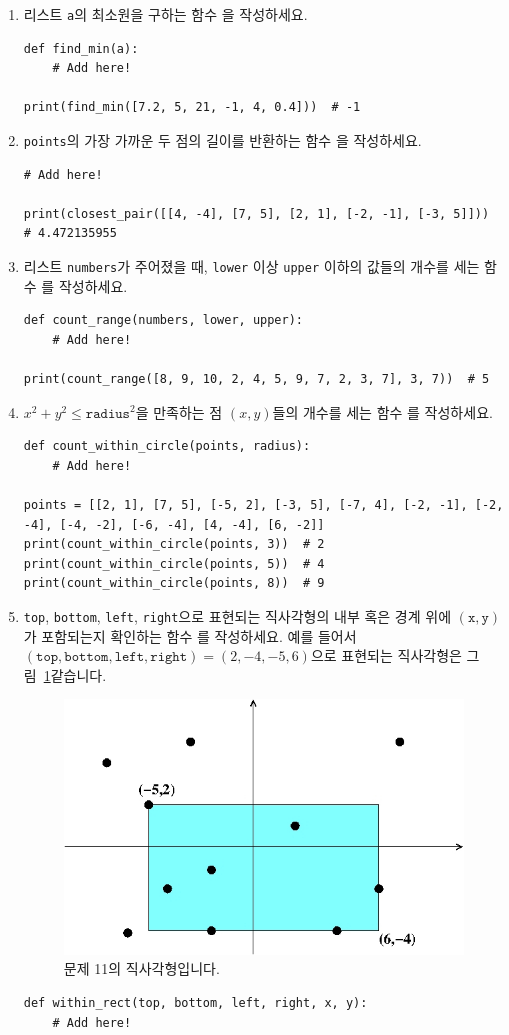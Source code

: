 \documentclass[../main.tex]{subfiles}
\begin{document}
\begin{enumerate}
\item 리스트 \verb/a/의 최소원을 구하는 함수 을 작성하세요.
\begin{verbatim}
def find_min(a):
    # Add here!

print(find_min([7.2, 5, 21, -1, 4, 0.4]))  # -1
\end{verbatim}

\item \verb/points/의 가장 가까운 두 점의 길이를 반환하는 함수 을 작성하세요.
\begin{verbatim}
# Add here!

print(closest_pair([[4, -4], [7, 5], [2, 1], [-2, -1], [-3, 5]]))  # 4.472135955
\end{verbatim}

\item 리스트 \verb/numbers/가 주어졌을 때, \verb/lower/ 이상 \verb/upper/ 이하의 값들의 개수를 세는 함수 를 작성하세요.
\begin{verbatim}
def count_range(numbers, lower, upper):
    # Add here!

print(count_range([8, 9, 10, 2, 4, 5, 9, 7, 2, 3, 7], 3, 7))  # 5
\end{verbatim}

\item $x^2 + y^2 \le \texttt{radius}^2$을 만족하는 점 $(x, y)$들의 개수를 세는 함수 를 작성하세요.
\begin{verbatim}
def count_within_circle(points, radius):
    # Add here!

points = [[2, 1], [7, 5], [-5, 2], [-3, 5], [-7, 4], [-2, -1], [-2, -4], [-4, -2], [-6, -4], [4, -4], [6, -2]]
print(count_within_circle(points, 3))  # 2
print(count_within_circle(points, 5))  # 4
print(count_within_circle(points, 8))  # 9
\end{verbatim}

\item \verb/top/, \verb/bottom/, \verb/left/, \verb/right/으로 표현되는 직사각형의 내부 혹은 경계 위에 $(\texttt{x}, \texttt{y})$가 포함되는지 확인하는 함수 를 작성하세요.
  예를 들어서 $(\texttt{top}, \texttt{bottom}, \texttt{left}, \texttt{right}) = (2, -4, -5, 6)$으로 표현되는 직사각형은 그림~\ref{fig:lecture4q11}\와 같습니다.
\begin{figure}[H]
\centering
\includegraphics[width=0.5\linewidth]{"./lectures/lecture4_q11"}
\caption{문제 11의 직사각형입니다.}\label{fig:lecture4q11}
\end{figure}
\begin{verbatim}
def within_rect(top, bottom, left, right, x, y):
    # Add here!


\end{verbatim}
\end{enumerate}
\end{document}

